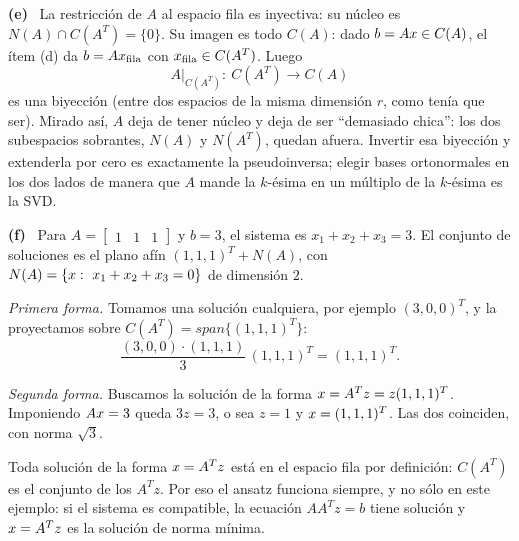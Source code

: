 \documentclass[11pt,a4paper]{article}
\newcommand{\bi}[1]{\boldsymbol{#1}}
\newcommand{\n}[1]{\boldsymbol{#1}}
\newcommand{\bb}{\bi{b}}  \newcommand{\ba}{\bi{a}}  \newcommand{\bz}{\bi{z}}
\DeclareMathOperator{\gen}{span}
\DeclareMathOperator{\tr}{tr}
\DeclareMathOperator{\rg}{rg}
\def\n#1{#1}\def\bi#1{#1}\def\rg{rg}\def\tr{tr}\def\gen{span}%
\newcommand{\itemsol}[1]{\par\medskip\noindent\textbf{(#1)}\ \ignorespaces}
\begin{document}
\itemsol{e} La restricción de $A$ al espacio fila es inyectiva: su núcleo es
$N(A)\cap C(A^T)=\{\n0\}$. Su imagen es todo $C(A)$: dado $\bb=A\bx\in C(A)$, el
ítem (d) da $\bb=A\bx_{\text{fila}}$ con $\bx_{\text{fila}}\in C(A^T)$. Luego
\[
A\big|_{C(A^T)}:\ C(A^T)\longrightarrow C(A)
\]
es una biyección (entre dos espacios de la misma dimensión $r$, como tenía que
ser). Mirado así, $A$ deja de tener núcleo y deja de ser ``demasiado chica'':
los dos subespacios sobrantes, $N(A)$ y $N(A^T)$, quedan afuera. Invertir esa
biyección y extenderla por cero es exactamente la pseudoinversa; elegir bases
ortonormales en los dos lados de manera que $A$ mande la $k$-ésima en un
múltiplo de la $k$-ésima es la SVD.

\itemsol{f} Para $A=\begin{bmatrix}1&1&1\end{bmatrix}$ y $\bb=3$, el sistema es
$x_1+x_2+x_3=3$. El conjunto de soluciones es el plano afín $(1,1,1)^T+N(A)$,
con $N(A)=\{\bx:\ x_1+x_2+x_3=0\}$ de dimensión $2$.

\emph{Primera forma.} Tomamos una solución cualquiera, por ejemplo $(3,0,0)^T$,
y la proyectamos sobre $C(A^T)=\gen\{(1,1,1)^T\}$:
\[
\frac{(3,0,0)\cdot(1,1,1)}{3}\,(1,1,1)^T=(1,1,1)^T .
\]

\emph{Segunda forma.} Buscamos la solución de la forma
$\bx=A^T\bi{z}=z(1,1,1)^T$. Imponiendo $A\bx=3$ queda $3z=3$, o sea $z=1$ y
$\bx=(1,1,1)^T$. Las dos coinciden, con norma $\sqrt3$.

Toda solución de la forma $\bx=A^T\bi{z}$ está en el espacio fila por
definición: $C(A^T)$ es el conjunto de los $A^T\bi{z}$. Por eso el ansatz
funciona siempre, y no sólo en este ejemplo: si el sistema es compatible, la
ecuación $AA^T\bi{z}=\bb$ tiene solución y $\bx=A^T\bi{z}$ es la solución de
norma mínima.
\end{document}
